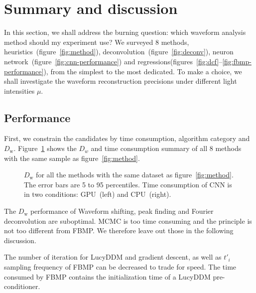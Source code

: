 \section{Summary and discussion}
\label{sec:discussion}

In this section, we shall address the burning question: which waveform analysis method should my experiment use?  We surveyed 8 methods, heuristics~(figure~\ref{fig:method}), deconvolution~(figure~\ref{fig:deconv}), neuron network~(figure~\ref{fig:cnn-performance}) and regressions(figures~\ref{fig:dcf}--\ref{fig:fbmp-performance}), from the simplest to the most dedicated.  To make a choice, we shall investigate the waveform reconstruction precisions under different light intensities $\mu$.

\subsection{Performance}

First, we constrain the candidates by time consumption, algorithm category and $D_\mathrm{w}$.  Figure~\ref{fig:chargesummary} shows the $D_w$ and time consumption summary of all 8 methods with the same sample as figure~\ref{fig:method}.
\begin{figure}[H]
    \centering
    \resizebox{\textwidth}{!}{}
    \caption{\label{fig:chargesummary} $D_\mathrm{w}$ for all the methods with the same dataset as figure~\ref{fig:method}. The error bars are 5 to 95 percentiles. Time consumption of CNN is in two conditions: GPU\protect\footnotemark~(left) and CPU\protect\footnotemark~(right). }
\end{figure}
\addtocounter{footnote}{-2}

The $D_\mathrm{w}$ performance of Waveform shifting, peak finding and Fourier deconvolution are suboptimal.  MCMC is too time consuming and the principle is not too different from FBMP.  We therefore leave out those in the following discussion.

The number of iteration for LucyDDM and gradient descent, as well as $t'_i$ sampling frequency of FBMP can be decreased to trade for speed. The time consumed by FBMP contains the initialization time of a LucyDDM pre-conditioner. 


